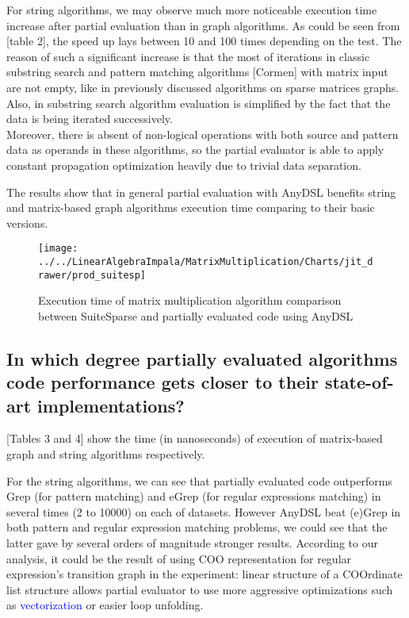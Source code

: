 \documentclass[conference]{IEEEtran}
\begin{document}
For string algorithms, we may observe much more noticeable execution time increase after partial evaluation than in graph algorithms. As could be seen from [table 2], the speed up lays between 10 and 100 times depending on the test. The reason of such a significant increase is that the most of iterations in classic substring search and pattern matching algorithms [Cormen] with matrix input are not empty, like in previously discussed algorithms on sparse matrices graphs. Also, in substring search algorithm evaluation is simplified by the fact that the data is being iterated successively.\\
Moreover, there is absent of non-logical operations with both source and pattern data as operands in these algorithms, so the partial evaluator is able to apply constant propagation optimization heavily due to trivial data separation.

The results show that in general partial evaluation with AnyDSL benefits string and matrix-based graph algorithms execution time comparing to their basic versions.

\begin{figure}[H]
	\centering
	\texttt{[image: ../../LinearAlgebraImpala/MatrixMultiplication/Charts/jit\_drawer/prod\_suitesp]}
	\caption{Execution time of matrix multiplication algorithm comparison between SuiteSparse and partially evaluated code using AnyDSL}
\end{figure}

\begin{figure}
	\centering
\end{figure}

\subsection{In which degree partially evaluated algorithms code performance gets closer to their state-of-art implementations?}

[Tables 3 and 4] show the time (in nanoseconds) of execution of matrix-based graph and string algorithms respectively. 

For the string algorithms, we can see that partially evaluated code outperforms Grep (for pattern matching) and eGrep (for regular expressions matching) in several times (2 to 10000) on each of datasets. However AnyDSL beat (e)Grep in both pattern and regular expression matching problems, we could see that the latter gave by several orders of magnitude stronger results. According to our analysis, it could be the result of using COO representation for regular expression's transition graph in the experiment: linear structure of a COOrdinate list structure allows partial evaluator to use more aggressive optimizations such as \textcolor{blue}{vectorization} or easier loop unfolding.
\end{document}
